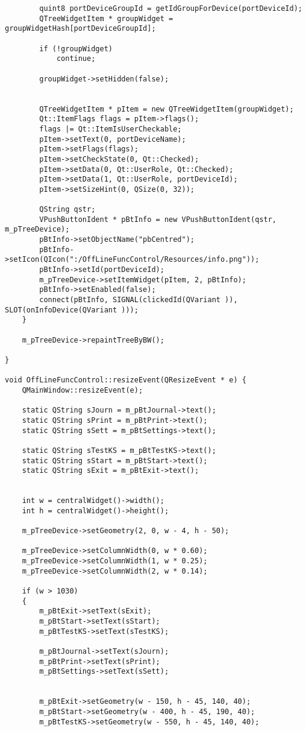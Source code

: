 \begin{verbatim}
		quint8 portDeviceGroupId = getIdGroupForDevice(portDeviceId);
		QTreeWidgetItem * groupWidget = groupWidgetHash[portDeviceGroupId];

		if (!groupWidget)
			continue;

		groupWidget->setHidden(false);


		QTreeWidgetItem * pItem = new QTreeWidgetItem(groupWidget);
		Qt::ItemFlags flags = pItem->flags();
		flags |= Qt::ItemIsUserCheckable;
		pItem->setText(0, portDeviceName);
		pItem->setFlags(flags);
		pItem->setCheckState(0, Qt::Checked);
		pItem->setData(0, Qt::UserRole, Qt::Checked);
		pItem->setData(1, Qt::UserRole, portDeviceId);
		pItem->setSizeHint(0, QSize(0, 32));

		QString qstr;
		VPushButtonIdent * pBtInfo = new VPushButtonIdent(qstr, m_pTreeDevice);
		pBtInfo->setObjectName("pbCentred");
		pBtInfo->setIcon(QIcon(":/OffLineFuncControl/Resources/info.png"));
		pBtInfo->setId(portDeviceId);
		m_pTreeDevice->setItemWidget(pItem, 2, pBtInfo);
		pBtInfo->setEnabled(false);
		connect(pBtInfo, SIGNAL(clickedId(QVariant )), SLOT(onInfoDevice(QVariant )));
	}

	m_pTreeDevice->repaintTreeByBW();

}

void OffLineFuncControl::resizeEvent(QResizeEvent * e) {
	QMainWindow::resizeEvent(e);

	static QString sJourn = m_pBtJournal->text();
	static QString sPrint = m_pBtPrint->text();
	static QString sSett = m_pBtSettings->text();

	static QString sTestKS = m_pBtTestKS->text();
	static QString sStart = m_pBtStart->text();
	static QString sExit = m_pBtExit->text();


	int w = centralWidget()->width();
	int h = centralWidget()->height();

	m_pTreeDevice->setGeometry(2, 0, w - 4, h - 50);

	m_pTreeDevice->setColumnWidth(0, w * 0.60);
	m_pTreeDevice->setColumnWidth(1, w * 0.25);
	m_pTreeDevice->setColumnWidth(2, w * 0.14);

	if (w > 1030)
	{
		m_pBtExit->setText(sExit);
		m_pBtStart->setText(sStart);
		m_pBtTestKS->setText(sTestKS);

		m_pBtJournal->setText(sJourn);
		m_pBtPrint->setText(sPrint);
		m_pBtSettings->setText(sSett);


		m_pBtExit->setGeometry(w - 150, h - 45, 140, 40);
		m_pBtStart->setGeometry(w - 400, h - 45, 190, 40);
		m_pBtTestKS->setGeometry(w - 550, h - 45, 140, 40);


\end{verbatim}
